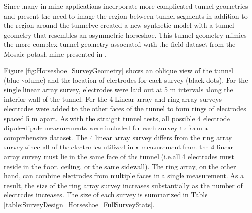 \documentclass[preprint,authoryear,12pt]{elsarticle}
\providecommand{\DIFaddtex}[1]{{\protect\color{blue}\uwave{#1}}} %
\providecommand{\DIFdeltex}[1]{{\protect\color{red}\sout{#1}}}                      %
\providecommand{\DIFaddbegin}{} %
\providecommand{\DIFaddend}{} %
\providecommand{\DIFdelbegin}{} %
\providecommand{\DIFdelend}{} %
\providecommand{\DIFadd}[1]{\texorpdfstring{\DIFaddtex{#1}}{#1}} %
\providecommand{\DIFdel}[1]{\texorpdfstring{\DIFdeltex{#1}}{}} %
\begin{document}
\DIFaddend Since many in-mine applications incorporate more complicated tunnel geometries and present the need to image the region between tunnel segments in addition to the region around the tunnel\DIFaddbegin \DIFadd{, }\DIFaddend we created a new synthetic model with a tunnel geometry that resembles an asymmetric horseshoe. This tunnel geometry mimics the more complex tunnel geometry associated with the field dataset from the Mosaic potash mine presented in \citet{Mitchell2016a,Mitchell2016}.

Figure \ref{fig:Horseshoe_SurveyGeometry} shows an oblique view of the tunnel (\DIFdelbegin \DIFdel{blue }\DIFdelend \DIFaddbegin \DIFadd{dark purple }\DIFaddend volume) and the location of electrodes for each survey (black dots). For the single linear array survey, electrodes were laid out at 5 m intervals along the interior wall of the tunnel. For the 4 \DIFdelbegin \DIFdel{Linear }\DIFdelend \DIFaddbegin \DIFadd{linear }\DIFaddend array and ring array surveys electrodes were added to the other faces of the tunnel to form rings of electrodes spaced 5 m apart. As with the straight tunnel tests, all possible 4 electrode dipole-dipole measurements were included for each survey to form a comprehensive dataset. The 4 linear array survey differs from the ring array survey since all of the electrodes utilized in a measurement from the 4 linear array survey must lie in the same face of the tunnel (i.e.\DIFaddbegin \DIFadd{, }\DIFaddend all 4 electrodes must reside in the floor, ceiling, or the same sidewall). The ring array, on the other hand, can combine electrodes from multiple faces in a single measurement. As a result, the size of the ring array survey increases substantially as the number of electrodes increases. The size of each survey is summarized in Table \ref{table:SurveyDesign_Horseshoe_FullSurveyStats}.
\end{document}
